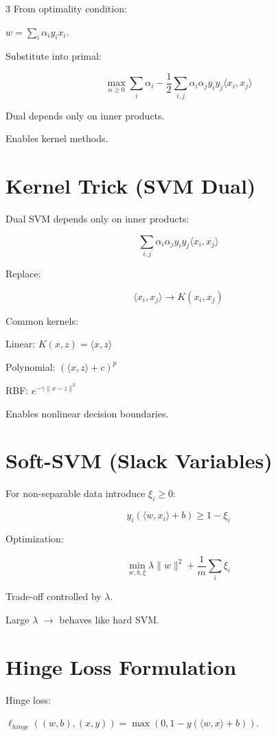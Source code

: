 \documentclass[8pt,fleqn]{extarticle}
\begin{document}
\begin{multicols}{3}
From optimality condition:

$w=\sum_i \alpha_i y_i x_i$.

Substitute into primal:

\[
\max_{\alpha\ge0}
\sum_i \alpha_i
-
\frac12\sum_{i,j}
\alpha_i\alpha_j y_i y_j
\langle x_i,x_j\rangle
\]

Dual depends only on inner products.

Enables kernel methods.

\section*{Kernel Trick (SVM Dual)}

Dual SVM depends only on inner products:

\[
\sum_{i,j}\alpha_i\alpha_j y_i y_j
\langle x_i,x_j\rangle
\]

Replace:

\[
\langle x_i,x_j\rangle
\rightarrow
K(x_i,x_j)
\]

Common kernels:

Linear:
$K(x,z)=\langle x,z\rangle$

Polynomial:
$(\langle x,z\rangle+c)^p$

RBF:
$e^{-\gamma\|x-z\|^2}$

Enables nonlinear decision boundaries.


\section*{Soft-SVM (Slack Variables)}

For non-separable data introduce $\xi_i\ge0$:

\[
y_i(\langle w,x_i\rangle+b)\ge1-\xi_i
\]

Optimization:

\[
\min_{w,b,\xi}
\lambda\|w\|^2+\frac1m\sum_i \xi_i
\]

Trade-off controlled by $\lambda$.

Large $\lambda$ $\to$ behaves like hard SVM.

\section*{Hinge Loss Formulation}

Hinge loss:

$\ell_{hinge}((w,b),(x,y))=\max(0,1-y(\langle w,x\rangle+b))$.


\end{multicols}
\end{document}

